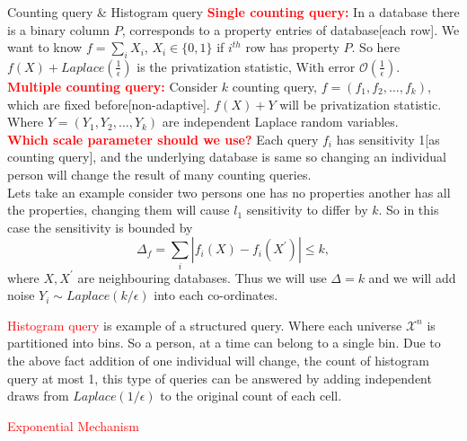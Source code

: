 \documentclass[aspectratio=169]{beamer}
\newcommand{\tcr}{\textcolor{red}}
\begin{document}
\begin{frame}[allowframebreaks]{Counting query \& Histogram query}
\tcr{\textbf{Single counting query: }}In a database there is a binary column $P$, corresponds to a property entries of database[each row]. We want to know $f=\sum_{i} X_i$, $X_i \in \{0,1\}$ if $i^{th}$ row has property $P$. So here $f(X)+ Laplace(\frac{1}{\epsilon})$ is the privatization statistic, With error $\mathcal{O} (\frac{1}{\epsilon})$.\\

\tcr{\textbf{Multiple counting query: }}Consider $k$ counting query, $f=(f_1,f_2, \dots, f_k)$, which are fixed before[non-adaptive]. $f(X)+ Y$ will be privatization statistic. Where $Y=(Y_1,Y_2, \dots, Y_k)$ are independent Laplace random variables.\\ 
\tcr{\textbf{Which scale parameter should we use?}} Each query $f_i$ has sensitivity 1[as counting query], and the underlying database is same so changing an individual person will change the result of many counting queries.\\
Lets take an example consider two persons one has no properties another has all the properties, changing them will cause $l_1$ sensitivity to differ by $k$. So in this case the sensitivity is bounded by
$$\Delta_f=\sum_{i} |f_i(X)-f_i(X^\prime)| \leq k,$$
where $X, X^\prime$ are neighbouring databases. Thus we will use $\Delta=k$ and we will add noise $Y_i \sim Laplace(k/\epsilon)$ into each co-ordinates.


\tcr{Histogram query} is example of a structured query. Where each universe $\mathscr{X}^n$ is partitioned into bins. So a person, at a time can belong to a single bin. Due to the above fact addition of one individual will change, the count of histogram query at most 1, this type of queries can be answered by adding independent draws from $Laplace(1/\epsilon)$ to the original count of each cell.
\end{frame}




\begin{frame}
\begin{center}
\Huge \tcr{Exponential Mechanism}
\end{center}
\begin{figure}[!ht]
        \centering
        \label{fig:lap}
\end{figure}
\end{frame}
\end{document}
